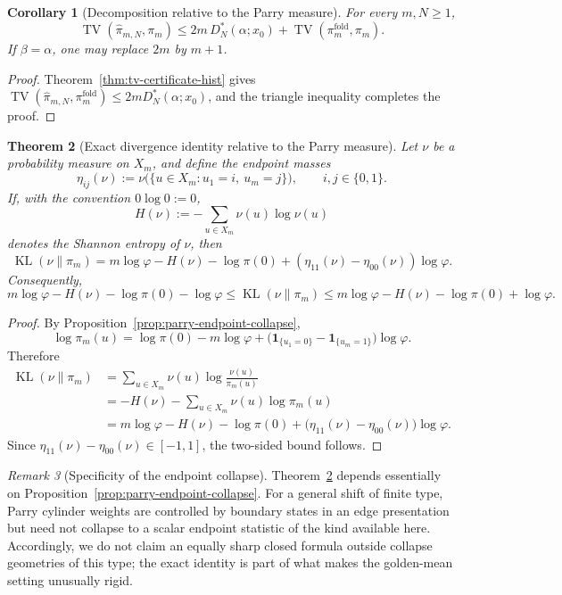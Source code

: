 \documentclass[11pt,letterpaper]{article}
\numberwithin{equation}{section}
\theoremstyle{plain}
\newtheorem{theorem}{Theorem}[section]
\newtheorem{corollary}[theorem]{Corollary}
\theoremstyle{definition}
\theoremstyle{remark}
\newtheorem{remark}[theorem]{Remark}
\DeclareMathOperator{\TV}{TV}
\DeclareMathOperator{\KL}{KL}
\begin{document}
\begin{corollary}[Decomposition relative to the Parry measure]\label{cor:tv-decomposition-parry}
For every $m,N\ge 1$,
\[
\TV(\hat\pi_{m,N},\pi_m)
\le
2m\,D_N^*(\alpha;x_0)+\TV(\pi_m^{\mathrm{fold}},\pi_m).
\]
If \(\beta=\alpha\), one may replace \(2m\) by \(m+1\).
\end{corollary}

\begin{proof}
Theorem~\ref{thm:tv-certificate-hist} gives
$\TV(\hat\pi_{m,N},\pi_m^{\mathrm{fold}})\le 2mD_N^*(\alpha;x_0)$, and the
triangle inequality completes the proof.
\end{proof}

\begin{theorem}[Exact divergence identity relative to the Parry measure]\label{thm:parry-kl-identity}
Let \(\nu\) be a probability measure on \(X_m\), and define the endpoint masses
\[
\eta_{ij}(\nu):=\nu\bigl(\{u\in X_m:u_1=i,\ u_m=j\}\bigr),
\qquad i,j\in\{0,1\}.
\]
If, with the convention \(0\log 0:=0\),
\[
H(\nu):=-\sum_{u\in X_m}\nu(u)\log \nu(u)
\]
denotes the Shannon entropy of \(\nu\), then
\[
\KL(\nu\|\pi_m)
=
m\log\varphi-H(\nu)-\log\pi(0)
{}+(\eta_{11}(\nu)-\eta_{00}(\nu))\log\varphi.
\]
Consequently,
\[
m\log\varphi-H(\nu)-\log\pi(0)-\log\varphi
\le
\KL(\nu\|\pi_m)
\le
m\log\varphi-H(\nu)-\log\pi(0)+\log\varphi.
\]
\end{theorem}

\begin{proof}
By Proposition~\ref{prop:parry-endpoint-collapse},
\[
\log \pi_m(u)
=
\log\pi(0)-m\log\varphi
{}+\bigl(\mathbf{1}_{\{u_1=0\}}-\mathbf{1}_{\{u_m=1\}}\bigr)\log\varphi.
\]
Therefore
\[
\begin{aligned}
\KL(\nu\|\pi_m)
&=
\sum_{u\in X_m}\nu(u)\log\frac{\nu(u)}{\pi_m(u)}\\
&=
-H(\nu)-\sum_{u\in X_m}\nu(u)\log\pi_m(u)\\
&=
m\log\varphi-H(\nu)-\log\pi(0)
{}+\bigl(\eta_{11}(\nu)-\eta_{00}(\nu)\bigr)\log\varphi.
\end{aligned}
\]
Since \(\eta_{11}(\nu)-\eta_{00}(\nu)\in[-1,1]\), the two-sided bound follows.
\end{proof}

\begin{remark}[Specificity of the endpoint collapse]\label{rem:endpoint-collapse-specificity}
Theorem~\ref{thm:parry-kl-identity} depends essentially on
Proposition~\ref{prop:parry-endpoint-collapse}. For a general shift of finite
type, Parry cylinder weights are controlled by boundary states in an edge
presentation but need not collapse to a scalar endpoint statistic of the kind
available here. Accordingly, we do not claim an equally sharp closed formula
outside collapse geometries of this type; the exact identity is part of what
makes the golden-mean setting unusually rigid.
\end{remark}
\end{document}
